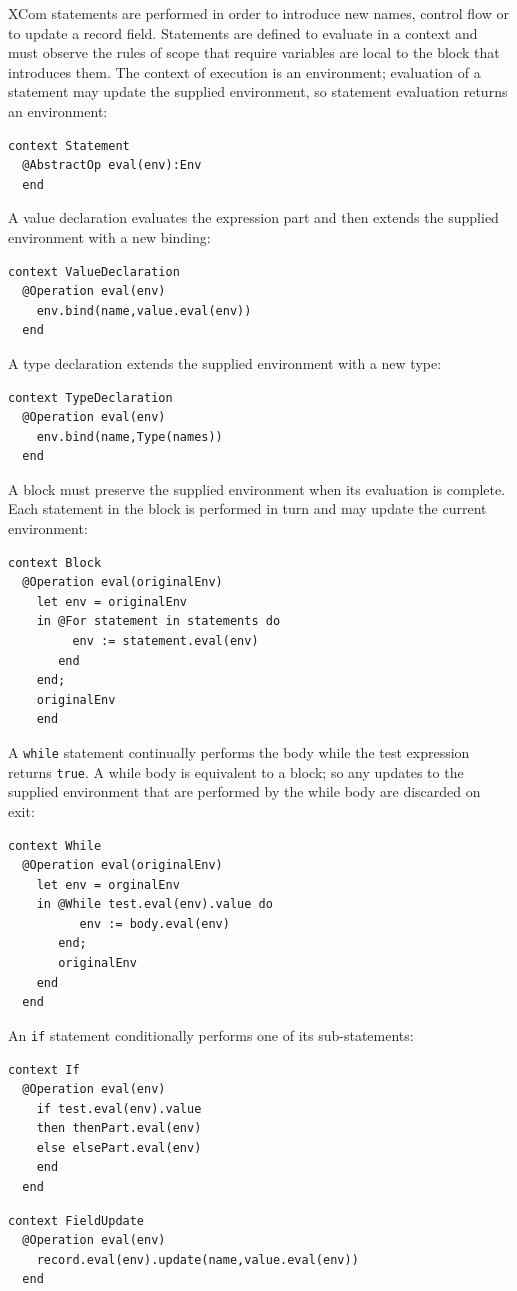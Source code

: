 \documentclass{article}
\begin{document}
XCom statements are performed in order to introduce new names, control flow or to update a record field.
Statements are defined to evaluate in a context and must observe the rules of scope that require 
variables are local to the block that introduces them. The context of execution is an environment;
evaluation of a statement may update the supplied environment, so statement evaluation returns
an environment:
\begin{verbatim}
context Statement
  @AbstractOp eval(env):Env
  end
\end{verbatim}
A value declaration evaluates the expression part and then extends the supplied environment with a new
binding:
\begin{verbatim}
context ValueDeclaration
  @Operation eval(env)
    env.bind(name,value.eval(env))
  end
\end{verbatim}
A type declaration extends the supplied environment with a new type:
\begin{verbatim}
context TypeDeclaration
  @Operation eval(env)
    env.bind(name,Type(names))
  end
\end{verbatim}
A block must preserve the supplied environment when its evaluation is complete. Each statement in
the block is performed in turn and may update the current environment:
\begin{verbatim}
context Block
  @Operation eval(originalEnv)
    let env = originalEnv
    in @For statement in statements do
         env := statement.eval(env)
       end
    end;
    originalEnv
    end
\end{verbatim}
A {\tt while} statement continually performs the body while the test expression returns {\tt true}.
A while body is equivalent to a block; so any updates to the supplied environment that are
performed by the while body are discarded on exit:
\begin{verbatim}
context While
  @Operation eval(originalEnv)
    let env = orginalEnv
    in @While test.eval(env).value do
          env := body.eval(env)
       end;
       originalEnv
    end
  end
\end{verbatim}
An {\tt if} statement conditionally performs one of its sub-statements:
\begin{verbatim}
context If
  @Operation eval(env)
    if test.eval(env).value
    then thenPart.eval(env)
    else elsePart.eval(env)
    end
  end
\end{verbatim}

\begin{verbatim}
context FieldUpdate
  @Operation eval(env)
    record.eval(env).update(name,value.eval(env))
  end
\end{verbatim}
\end{document}
